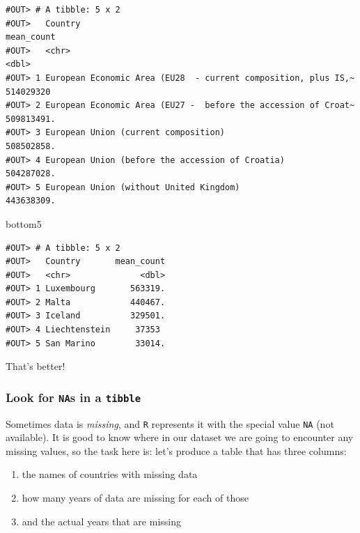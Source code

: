 \documentclass[]{book}
\newenvironment{Shaded}{\begin{snugshade}}{\end{snugshade}}
\newcommand{\NormalTok}[1]{#1}
\providecommand{\tightlist}{%
  \setlength{\itemsep}{0pt}\setlength{\parskip}{0pt}}
\begin{document}
\begin{verbatim}
#OUT> # A tibble: 5 x 2
#OUT>   Country                                                        mean_count
#OUT>   <chr>                                                               <dbl>
#OUT> 1 European Economic Area (EU28  - current composition, plus IS,~ 514029320 
#OUT> 2 European Economic Area (EU27 -  before the accession of Croat~ 509813491.
#OUT> 3 European Union (current composition)                           508502858.
#OUT> 4 European Union (before the accession of Croatia)               504287028.
#OUT> 5 European Union (without United Kingdom)                        443638309.
\end{verbatim}

\begin{Shaded}
\begin{Highlighting}[]
\NormalTok{bottom5}
\end{Highlighting}
\end{Shaded}

\begin{verbatim}
#OUT> # A tibble: 5 x 2
#OUT>   Country       mean_count
#OUT>   <chr>              <dbl>
#OUT> 1 Luxembourg       563319.
#OUT> 2 Malta            440467.
#OUT> 3 Iceland          329501.
#OUT> 4 Liechtenstein     37353 
#OUT> 5 San Marino        33014.
\end{verbatim}

That's better!

\hypertarget{look-for-nas-in-a-tibble}{%
\subsubsection*{\texorpdfstring{Look for \texttt{NA}s in a \texttt{tibble}}{Look for NAs in a tibble}}\label{look-for-nas-in-a-tibble}}

Sometimes data is \emph{missing}, and \texttt{R} represents it with the special value \texttt{NA} (not available). It is good to know where in our dataset we are going to encounter any missing values, so the task here is: let's produce a table that has three columns:

\begin{enumerate}
\def\labelenumi{\arabic{enumi}.}
\tightlist
\item
  the names of countries with missing data
\item
  how many years of data are missing for each of those
\item
  and the actual years that are missing
\end{enumerate}
\end{document}
